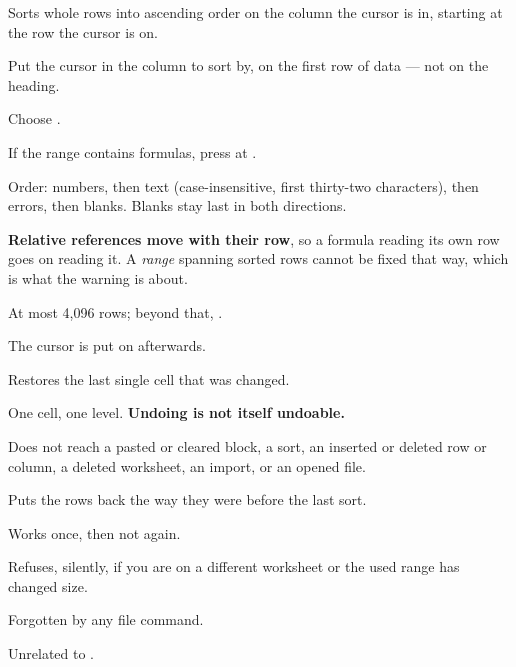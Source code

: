 
Sorts whole rows into ascending order on the column the cursor is in, starting
at the row the cursor is on.

\begin{ccprocedure}[]
\item Put the cursor in the column to sort by, on the first row of data --- not
on the heading.
\item Choose .
\item If the range contains formulas, press  at
.
\end{ccprocedure}

\begin{ccsteps}
\item Order: numbers, then text (case-insensitive, first thirty-two
characters), then errors, then blanks. Blanks stay last in both directions.
\item \textbf{Relative references move with their row}, so a formula reading
its own row goes on reading it. A \emph{range} spanning sorted rows cannot be
fixed that way, which is what the warning is about.
\item At most 4,096 rows; beyond that, .
\item The cursor is put on  afterwards.
\end{ccsteps}


Restores the last single cell that was changed.

\begin{ccsteps}
\item One cell, one level. \textbf{Undoing is not itself undoable.}
\item Does not reach a pasted or cleared block, a sort, an inserted or deleted
row or column, a deleted worksheet, an import, or an opened file.
\end{ccsteps}


Puts the rows back the way they were before the last sort.

\begin{ccsteps}
\item Works once, then not again.
\item Refuses, silently, if you are on a different worksheet or the used range
has changed size.
\item Forgotten by any file command.
\item Unrelated to  .
\end{ccsteps}
